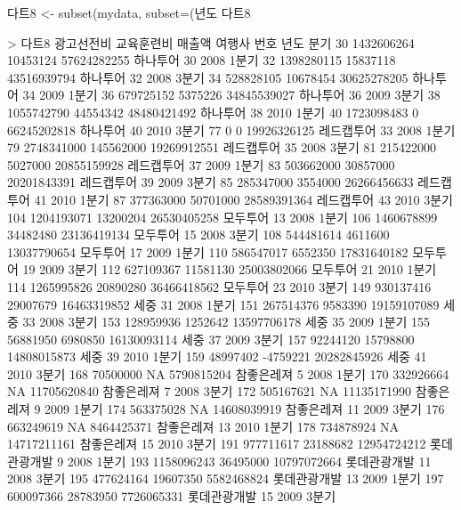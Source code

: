 \documentclass[tutorial.tex]{subfiles}
\begin{document}
\begin{Schunk}
\begin{Soutput}
다트8 <- subset(mydata, subset=(년도 %in% c("2008", "2009", "2010") & 분기 %in% c("1분기", "3분기")))
다트8

> 다트8
    광고선전비 교육훈련비      매출액       여행사 번호 년도  분기
30  1432606264   10453124 57624282255     하나투어   30 2008 1분기
32  1398280115   15837118 43516939794     하나투어   32 2008 3분기
34   528828105   10678454 30625278205     하나투어   34 2009 1분기
36   679725152    5375226 34845539027     하나투어   36 2009 3분기
38  1055742790   44554342 48480421492     하나투어   38 2010 1분기
40  1723098483          0 66245202818     하나투어   40 2010 3분기
77           0          0 19926326125   레드캡투어   33 2008 1분기
79  2748341000  145562000 19269912551   레드캡투어   35 2008 3분기
81   215422000    5027000 20855159928   레드캡투어   37 2009 1분기
83   503662000   30857000 20201843391   레드캡투어   39 2009 3분기
85   285347000    3554000 26266456633   레드캡투어   41 2010 1분기
87   377363000   50701000 28589391364   레드캡투어   43 2010 3분기
104 1204193071   13200204 26530405258     모두투어   13 2008 1분기
106 1460678899   34482480 23136419134     모두투어   15 2008 3분기
108  544481614    4611600 13037790654     모두투어   17 2009 1분기
110  586547017    6552350 17831640182     모두투어   19 2009 3분기
112  627109367   11581130 25003802066     모두투어   21 2010 1분기
114 1265995826   20890280 36466418562     모두투어   23 2010 3분기
149  930137416   29007679 16463319852         세중   31 2008 1분기
151  267514376    9583390 19159107089         세중   33 2008 3분기
153  128959936    1252642 13597706178         세중   35 2009 1분기
155   56881950    6980850 16130093114         세중   37 2009 3분기
157   92244120   15798800 14808015873         세중   39 2010 1분기
159   48997402   -4759221 20282845926         세중   41 2010 3분기
168   70500000         NA  5790815204   참좋은레져    5 2008 1분기
170  332926664         NA 11705620840   참좋은레져    7 2008 3분기
172  505167621         NA 11135171990   참좋은레져    9 2009 1분기
174  563375028         NA 14608039919   참좋은레져   11 2009 3분기
176  663249619         NA  8464425371   참좋은레져   13 2010 1분기
178  734878924         NA 14717211161   참좋은레져   15 2010 3분기
191  977711617   23188682 12954724212 롯데관광개발    9 2008 1분기
193 1158096243   36495000 10797072664 롯데관광개발   11 2008 3분기
195  477624164   19607350  5582468824 롯데관광개발   13 2009 1분기
197  600097366   28783950  7726065331 롯데관광개발   15 2009 3분기

\end{Soutput}
\end{Schunk}
\end{document}
